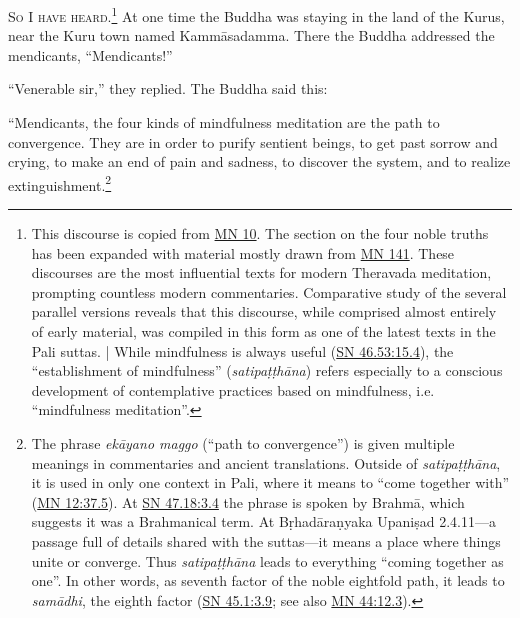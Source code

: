 \documentclass[12pt,openany]{book}%
\newcommand*{\scevam}[1]{\textsc{#1}}
\begin{document}
\scevam{So I have heard.\footnote{This discourse is copied from \href{https://suttacentral.net/mn10/en/sujato}{MN 10}. The section on the four noble truths has been expanded with material mostly drawn from \href{https://suttacentral.net/mn141/en/sujato}{MN 141}. These discourses are the most influential texts for modern Theravada meditation, prompting countless modern commentaries. Comparative study of the several parallel versions reveals that this discourse, while comprised almost entirely of early material, was compiled in this form as one of the latest texts in the Pali suttas. | While mindfulness is always useful (\href{https://suttacentral.net/sn46.53/en/sujato\#15.4}{SN 46.53:15.4}), the “establishment of mindfulness” (\textit{\textsanskrit{satipaṭṭhāna}}) refers especially to a conscious development of contemplative practices based on mindfulness, i.e. “mindfulness meditation”. } }At one time the Buddha was staying in the land of the Kurus, near the Kuru town named \textsanskrit{Kammāsadamma}. There the Buddha addressed the mendicants, “Mendicants!” 

“Venerable sir,” they replied. The Buddha said this: 

“Mendicants, the four kinds of mindfulness meditation are the path to convergence. They are in order to purify sentient beings, to get past sorrow and crying, to make an end of pain and sadness, to discover the system, and to realize extinguishment.\footnote{The phrase \textit{\textsanskrit{ekāyano} maggo} (“path to convergence”) is given multiple meanings in commentaries and ancient translations. Outside of \textit{\textsanskrit{satipaṭṭhāna}}, it is used in only one context in Pali, where it means to “come together with” (\href{https://suttacentral.net/mn12/en/sujato\#37.5}{MN 12:37.5}). At \href{https://suttacentral.net/sn47.18/en/sujato\#3.4}{SN 47.18:3.4} the phrase is spoken by \textsanskrit{Brahmā}, which suggests it was a Brahmanical term. At \textsanskrit{Bṛhadāraṇyaka} \textsanskrit{Upaniṣad} 2.4.11—a passage full of details shared with the suttas—it means a place where things unite or converge. Thus \textit{\textsanskrit{satipaṭṭhāna}} leads to everything “coming together as one”. In other words, as seventh factor of the noble eightfold path, it leads to \textit{\textsanskrit{samādhi}}, the eighth factor (\href{https://suttacentral.net/sn45.1/en/sujato\#3.9}{SN 45.1:3.9}; see also \href{https://suttacentral.net/mn44/en/sujato\#12.3}{MN 44:12.3}). } 
\end{document}

